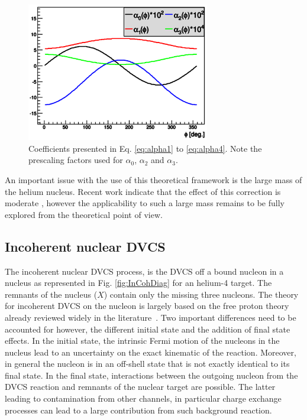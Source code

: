 \documentclass{article}
\begin{document}
\begin{figure}[tbp!]
\center
\includegraphics[width=8cm]{fig3/AlphaCoefs.png}
	\caption{Coefficients presented in Eq. \ref{eq:alpha1} to \ref{eq:alpha4}.
	Note the prescaling factors used for $\alpha_0$, $\alpha_2$ and $\alpha_3$.}
\label{fig:alphas}
\end{figure}

An important issue with the use of this theoretical framework is the large mass of the 
helium nucleus. Recent work indicate that the effect of this correction is moderate 
\cite{Braun:2012bg}, however the applicability to such a large mass remains to be
fully explored from the theoretical point of view.

\subsection{Incoherent nuclear DVCS}

The incoherent nuclear DVCS process, is the DVCS off a bound nucleon in a nucleus
as represented in Fig. \ref{fig:InCohDiag} for an helium-4 target. The remnants of 
the nucleus ($X$) contain only the missing three nucleons. 
The theory for incoherent DVCS on the nucleon is largely based on the free proton theory
already reviewed widely in the literature~\cite{Diehl:2003ny,Belitsky:2005qn,Guidal:2013rya}. 
Two important differences need to be accounted for however, the different initial state and the addition of 
final state effects. In the initial state, the intrinsic Fermi motion of the nucleons in the nucleus 
lead to an uncertainty on the exact kinematic of the reaction. Moreover, in general the nucleon 
is in an off-shell state that is not exactly identical to its final state. In the final state, 
interactions between the outgoing nucleon from the DVCS reaction and remnants of the nuclear 
target are possible. The latter leading to contamination from other channels, in particular 
charge exchange processes can lead to a large contribution from such background reaction. 
\end{document}
